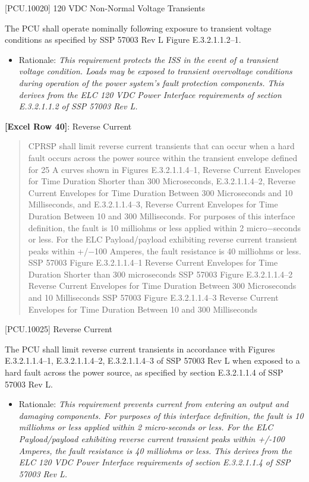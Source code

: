 [PCU.10020] 120 VDC Non-Normal Voltage Transients

The PCU shall operate nominally following exposure to transient voltage conditions as specified by SSP 57003 Rev L Figure E.3.2.1.1.2--1.

\begin{itemize}
\item{} Rationale: \emph{This requirement protects the ISS in the event of a transient voltage condition. Loads may be exposed to transient overvoltage conditions during operation of the power system's fault protection components. This derives from the ELC 120 VDC Power Interface requirements of section E.3.2.1.1.2 of SSP 57003 Rev L.}

\end{itemize}

\textbf{[Excel Row 40]}: Reverse Current

\begin{quote}
CPRSP shall limit reverse current transients that can occur when a hard fault occurs across the power source within the transient envelope defined for 25 A curves shown in Figures E.3.2.1.1.4--1, Reverse Current Envelopes for Time Duration Shorter than 300 Microseconds, E.3.2.1.1.4--2, Reverse Current Envelopes for Time Duration Between 300 Microseconds and 10 Milliseconds, and E.3.2.1.1.4--3, Reverse Current Envelopes for Time Duration Between 10 and 300 Milliseconds.
For purposes of this interface definition, the fault is 10 milliohms or less applied within 2 micro−seconds or less. For the ELC Payload\slash payload exhibiting reverse current transient peaks within +\slash −100 Amperes, the fault resistance is 40 milliohms or less.
SSP 57003 Figure E.3.2.1.1.4--1 Reverse Current Envelopes for Time Duration Shorter than 300 microseconds
SSP 57003 Figure E.3.2.1.1.4--2 Reverse Current Envelopes for Time Duration Between 300 Microseconds and 10 Milliseconds
SSP 57003 Figure E.3.2.1.1.4--3 Reverse Current Envelopes for Time Duration Between 10 and 300 Milliseconds
\end{quote}

[PCU.10025] Reverse Current

The PCU shall limit reverse current transients in accordance with Figures E.3.2.1.1.4--1, E.3.2.1.1.4--2, E.3.2.1.1.4--3 of SSP 57003 Rev L when exposed to a hard fault across the power source, as specified by section E.3.2.1.1.4 of SSP 57003 Rev L.

\begin{itemize}
\item{} Rationale: \emph{This requirement prevents current from entering an output and damaging components. For purposes of this interface definition, the fault is 10 milliohms or less applied within 2 micro-seconds or less. For the ELC Payload\slash payload exhibiting reverse current transient peaks within +\slash -100 Amperes, the fault resistance is 40 milliohms or less. This derives from the ELC 120 VDC Power Interface requirements of section E.3.2.1.1.4 of SSP 57003 Rev L.}

\end{itemize}


